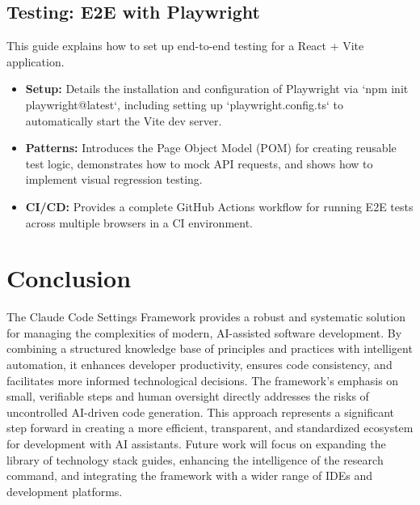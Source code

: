 \documentclass[preprint,12pt]{elsarticle}
\begin{document}
\subsection{Testing: E2E with Playwright}
This guide explains how to set up end-to-end testing for a React + Vite application.
\begin{itemize}
    \item \textbf{Setup:} Details the installation and configuration of Playwright via `npm init playwright@latest`, including setting up `playwright.config.ts` to automatically start the Vite dev server.
    \item \textbf{Patterns:} Introduces the Page Object Model (POM) for creating reusable test logic, demonstrates how to mock API requests, and shows how to implement visual regression testing.
    \item \textbf{CI/CD:} Provides a complete GitHub Actions workflow for running E2E tests across multiple browsers in a CI environment.
\end{itemize}

\section{Conclusion}
The Claude Code Settings Framework provides a robust and systematic solution for managing the complexities of modern, AI-assisted software development. By combining a structured knowledge base of principles and practices with intelligent automation, it enhances developer productivity, ensures code consistency, and facilitates more informed technological decisions. The framework's emphasis on small, verifiable steps and human oversight directly addresses the risks of uncontrolled AI-driven code generation. This approach represents a significant step forward in creating a more efficient, transparent, and standardized ecosystem for development with AI assistants. Future work will focus on expanding the library of technology stack guides, enhancing the intelligence of the research command, and integrating the framework with a wider range of IDEs and development platforms.



\end{document}
